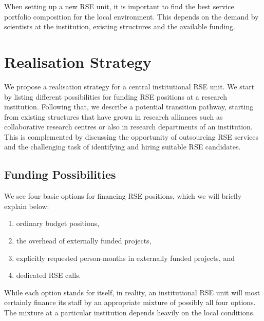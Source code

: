 \documentclass[a4paper]{article}
\begin{document}
When setting up a new RSE unit, it is important to find the best service portfolio composition for the local environment.
This depends on the demand by scientists at the institution, existing structures and the available funding.

\section{Realisation Strategy}%
\label{sec:realization}

We propose a realisation strategy for a central institutional RSE unit.
We start by listing different possibilities for funding RSE positions at a research institution.
Following that, we describe a potential transition pathway, starting from existing structures that have grown in research alliances such as collaborative research centres or also in research departments of an institution.
This is complemented by discussing the opportunity of outsourcing RSE services and the challenging task of identifying and hiring suitable RSE candidates.

\subsection{Funding Possibilities}%
\label{sec:funding}

We see four basic options for financing RSE positions, which we will briefly explain below:
\begin{enumerate}
\item ordinary budget positions,
\item the overhead of externally funded projects,
\item explicitly requested person-months in externally funded projects, and
\item dedicated RSE calls.
\end{enumerate}
While each option stands for itself, in reality, an institutional RSE unit will most certainly finance its staff by an appropriate mixture of possibly all four options.
The mixture at a particular institution depends heavily on the local conditions.
\end{document}
